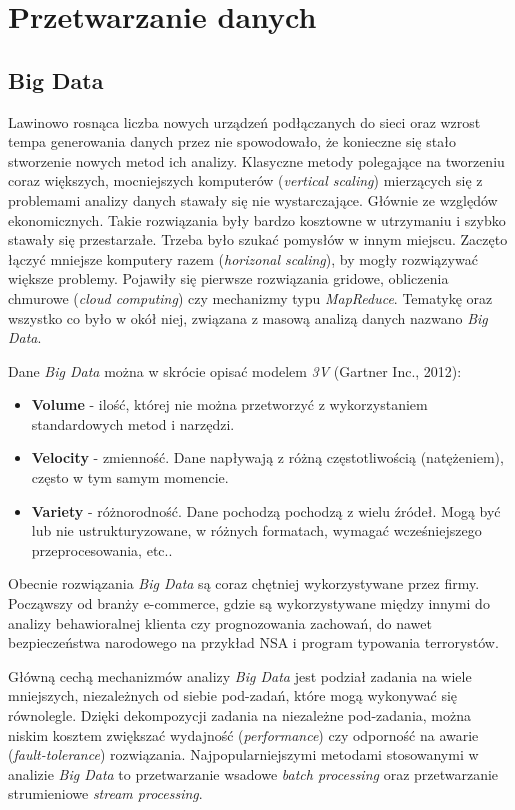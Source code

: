 \section{Przetwarzanie danych}
\subsection{Big Data}
Lawinowo rosnąca liczba nowych urządzeń podłączanych do sieci
oraz wzrost tempa generowania danych przez nie spowodowało,
że konieczne się stało stworzenie nowych metod ich analizy.
Klasyczne metody polegające na tworzeniu coraz większych,
mocniejszych komputerów (\textit{vertical scaling})
mierzących się z problemami analizy danych stawały się nie wystarczające.
Głównie ze względów ekonomicznych.
Takie rozwiązania były bardzo kosztowne w utrzymaniu i szybko stawały się przestarzałe.
Trzeba było szukać pomysłów w innym miejscu.
Zaczęto łączyć mniejsze komputery razem (\textit{horizonal scaling}),
by mogły rozwiązywać większe problemy.
Pojawiły się pierwsze rozwiązania gridowe,
obliczenia chmurowe (\textit{cloud computing})
czy mechanizmy typu \textit{MapReduce}.
Tematykę oraz wszystko co było w okół niej,
związana z masową analizą danych nazwano \textit{Big Data}.

Dane \textit{Big Data} można w skrócie opisać modelem \textit{3V} (Gartner Inc., 2012):
\begin{itemize}
		\item \textbf{Volume} - ilość,
		której nie można przetworzyć z wykorzystaniem standardowych metod i narzędzi.
		\item \textbf{Velocity} - zmienność.
		Dane napływają z różną częstotliwością (natężeniem),
		często w tym samym momencie.
		\item \textbf{Variety} - różnorodność.
		Dane pochodzą pochodzą z wielu źródeł.
		Mogą być lub nie ustrukturyzowane,
		w różnych formatach,
		wymagać wcześniejszego przeprocesowania,
		etc..
\end{itemize}

Obecnie rozwiązania \textit{Big Data} są coraz chętniej wykorzystywane przez firmy.
Począwszy od branży e-commerce,
gdzie są wykorzystywane między innymi do analizy behawioralnej klienta czy prognozowania zachowań,
do nawet bezpieczeństwa narodowego
na przykład NSA i program typowania terrorystów.

Główną cechą mechanizmów analizy \textit{Big Data} jest podział zadania
na wiele mniejszych,
niezależnych od siebie pod-zadań,
które mogą wykonywać się równolegle.
Dzięki dekompozycji zadania na niezależne pod-zadania,
	można niskim kosztem zwiększać wydajność (\textit{performance})
czy odporność na awarie (\textit{fault-tolerance}) rozwiązania.
Najpopularniejszymi metodami stosowanymi w analizie \textit{Big Data} to
przetwarzanie wsadowe \textit{batch processing}
oraz przetwarzanie strumieniowe \textit{stream processing}.

